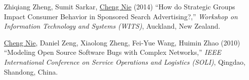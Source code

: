 \documentclass[paper=letter,fontsize=10pt]{scrartcl} %
\newcommand{\NewPart}[2]{\section*{{#1} #2}}
\newcommand{\ConfEntry}[6]{
		\noindent #1 (#2) ``#3,'' \textit{#4}, #5. \textcolor{blue}{#6}}
\newcommand{\TalkEntry}[3]{
		\noindent #1, #2 #3}
\newcommand{\Nie}{\underline{Cheng Nie}}
\begin{document}
\begin{etaremune}
\item \ConfEntry{Zhiqiang Zheng, Sumit Sarkar, \Nie}{2014}{How do Strategic Groups Impact Consumer Behavior in Sponsored Search Advertising?}{Workshop on Information Technology and Systems (WITS)}{Auckland, New Zealand}{}

\item \ConfEntry{\Nie, Daniel Zeng, Xiaolong Zheng, Fei-Yue Wang, Huimin Zhao}{2010}{Modeling Open Source Software Bugs with Complex Networks}{IEEE International Conference on Service Operations and Logistics (SOLI)}{Qingdao, Shandong, China}{}


\end{etaremune}











\end{document}
